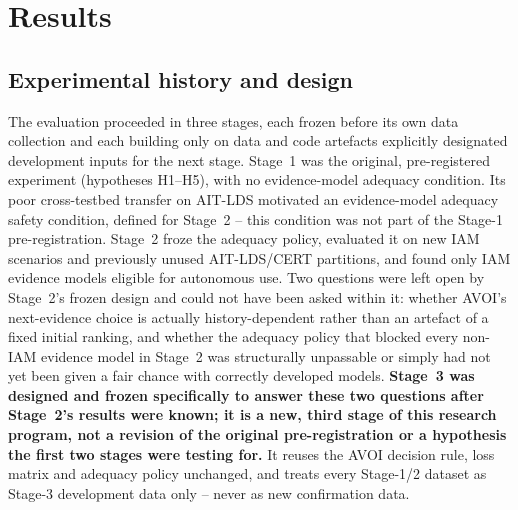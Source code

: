 \section{Results}

\subsection{Experimental history and design}
The evaluation proceeded in three stages, each frozen before its own data collection and each building only on data
and code artefacts explicitly designated development inputs for the next stage. Stage~1 was the original,
pre-registered experiment (hypotheses H1--H5), with no evidence-model adequacy condition. Its poor cross-testbed
transfer on AIT-LDS motivated an evidence-model adequacy safety condition, defined for Stage~2 -- this condition was
not part of the Stage-1 pre-registration. Stage~2 froze the adequacy policy, evaluated it on new IAM scenarios and
previously unused AIT-LDS/CERT partitions, and found only IAM evidence models eligible for autonomous use. Two
questions were left open by Stage~2's frozen design and could not have been asked within it: whether AVOI's
next-evidence choice is actually history-dependent rather than an artefact of a fixed initial ranking, and whether the
adequacy policy that blocked every non-IAM evidence model in Stage~2 was structurally unpassable or simply had not yet
been given a fair chance with correctly developed models. \textbf{Stage~3 was designed and frozen specifically to
answer these two questions after Stage~2's results were known; it is a new, third stage of this research program, not
a revision of the original pre-registration or a hypothesis the first two stages were testing for.} It reuses the
AVOI decision rule, loss matrix and adequacy policy unchanged, and treats every Stage-1/2 dataset as Stage-3
development data only -- never as new confirmation data.

